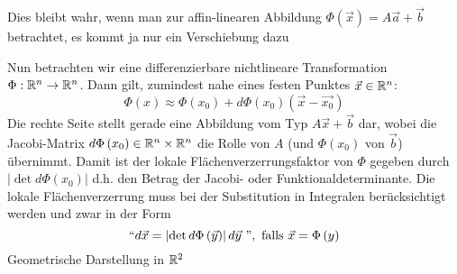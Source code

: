 Dies bleibt wahr, wenn man zur affin-linearen Abbildung $\Phi\left(\vec{x}\right)=A\vec a+\vec b$ betrachtet, es kommt ja nur ein Verschiebung dazu
\begin{center}
\end{center}
Nun betrachten wir eine differenzierbare nichtlineare Transformation $\Phi:\mathbb{R}^n \to\mathbb{R}^n$. Dann gilt, zumindest nahe eines festen Punktes $\vec x\in\mathbb{R}^n$:
\[ \Phi\left( x\right)\approx\Phi\left( x_0\right) + d\Phi\left( x_0\right) \left( \vec{x}-\vec{x_0}\right)\]
Die rechte Seite stellt gerade eine Abbildung vom Typ $A\vec x+\vec b$ dar, wobei die Jacobi-Matrix $d\Phi\left( x_0\right)\in\mathbb{R}^n\times\mathbb{R}^n$ die Rolle von $A$ (und $\Phi\left( x_0\right)$ von $\vec b$) übernimmt. Damit ist der lokale Flächenverzerrungsfaktor von $\Phi$ gegeben durch $\left| \det d\Phi\left( x_0\right)\right|$ d.h. den Betrag der Jacobi- oder Funktionaldeterminante. Die lokale Flächenverzerrung muss bei der Substitution in Integralen berücksichtigt werden und zwar in der Form
\[``d\vec x = \left| {\det d\Phi \left( {\vec y} \right)} \right|d\vec{y} \text{ ''},{\text{ falls }}\vec x = \Phi \left( y \right)\]
Geometrische Darstellung in $\mathbb{R}^2$

